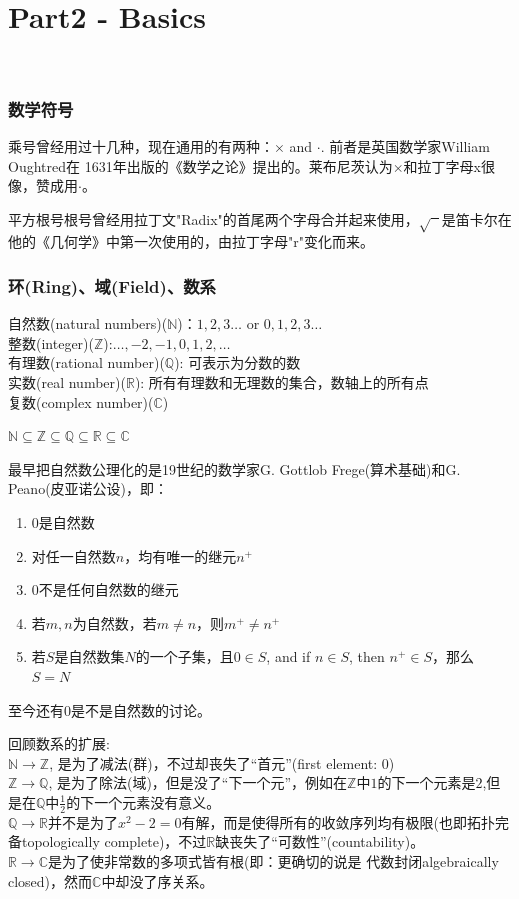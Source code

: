 \documentclass[../main.tex]{subfiles}
\begin{document}
\part{Part2 - Basics}\

\section{数学符号}
乘号曾经用过十几种，现在通用的有两种：$\times$ and $\cdot$. 前者是英国数学家William Oughtred在 1631年出版的《数学之论》提出的。莱布尼茨认为$\times$和拉丁字母x很像，赞成用$\cdot$。

平方根号根号曾经用拉丁文"Radix"的首尾两个字母合并起来使用，$\sqrt{\phantom{x}}$是笛卡尔在他的《几何学》中第一次使用的，由拉丁字母"r"变化而来。

\section{环(Ring)、域(Field)、数系}
自然数(natural numbers)($\mathbb{N}$)：$1,2,3\ldots$ or $0,1,2,3\ldots$\\
整数(integer)($\mathbb{Z}$):$\ldots, -2, -1, 0, 1, 2, \ldots$\\
有理数(rational number)($\mathbb{Q}$): 可表示为分数的数\\
实数(real number)($\mathbb{R}$): 所有有理数和无理数的集合，数轴上的所有点\\
复数(complex number)($\mathbb{C}$)

$\mathbb{N} \subseteq \mathbb{Z} \subseteq \mathbb{Q} \subseteq \mathbb{R} \subseteq \mathbb{C}$

最早把自然数公理化的是19世纪的数学家G. Gottlob Frege(算术基础)和G. Peano(皮亚诺公设)，即：
\vspace{-0.5em}
\begin{enumerate}
  \item $0$是自然数
  \item 对任一自然数$n$，均有唯一的继元$n^{+}$
  \item $0$不是任何自然数的继元
  \item 若$m, n$为自然数，若$m\neq n$，则$m^{+}\neq n^+$
  \item 若$S$是自然数集$N$的一个子集，且$0\in S$, and if $n \in S$, then $n^+\in S$，那么 $S=N$
\end{enumerate}
至今还有$0$是不是自然数的讨论。

回顾数系的扩展:\\
$\mathbb{N} \rightarrow \mathbb{Z}$, 是为了减法(群)，不过却丧失了“首元”(first element: 0)\\
$\mathbb{Z} \rightarrow \mathbb{Q}$, 是为了除法(域)，但是没了“下一个元”，例如在$\mathbb{Z}$中$1$的下一个元素是$2$,但是在$\mathbb{Q}$中$\frac{1}{2}$的下一个元素没有意义。\\
$\mathbb{Q} \rightarrow \mathbb{R}$并不是为了$x^2-2=0$有解，而是使得所有的收敛序列均有极限(也即拓扑完备topologically complete)，不过$\mathbb{R}$缺丧失了“可数性”(countability)。\\
$\mathbb{R} \rightarrow \mathbb{C}$是为了使非常数的多项式皆有根(即：更确切的说是 代数封闭algebraically closed)，然而$\mathbb{C}$中却没了序关系。
\end{document}
